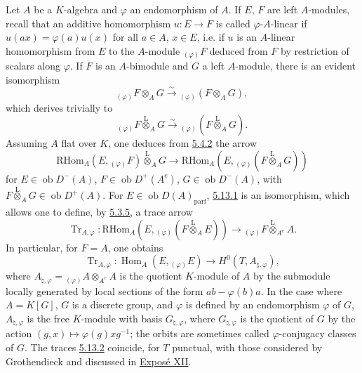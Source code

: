 \documentclass[11pt]{article}
\DeclareMathOperator{\Hom}{Hom}
\newcommand{\ob}{\operatorname{ob}}
\providecommand{\RHom}{\mathrm{RHom}}
\providecommand{\Tr}{\operatorname{Tr}}
\providecommand{\Tr}{\operatorname{Tr}}
\providecommand{\lten}{\overset{\mathrm L}{\otimes}}
\providecommand{\Tr}{\operatorname{Tr}}
\providecommand{\RHom}{\mathrm{RHom}}
\providecommand{\Hom}{\operatorname{Hom}}
\providecommand{\ob}{\operatorname{ob}}
\providecommand{\lten}{\overset{\mathrm L}{\otimes}}
\providecommand{\RHom}{\mathrm R\mathcal{H}om}
\providecommand{\lten}{\overset{\mathrm L}{\otimes}}
\providecommand{\Tr}{\operatorname{Tr}}
\providecommand{\lten}{\overset{\mathrm L}{\otimes}}
\providecommand{\lten}{\overset{\mathrm L}{\otimes}}
\providecommand{\lten}{\overset{\mathrm L}{\otimes}}
\providecommand{\RHom}{\mathrm{RHom}}
\providecommand{\Hom}{\operatorname{Hom}}
\providecommand{\Tr}{\operatorname{Tr}}
\providecommand{\lten}{\overset{\mathrm L}{\otimes}}
\begin{document}
Let $A$ be a $K$-algebra and $\varphi$ an endomorphism of $A$. If $E$, $F$ are left $A$-modules, recall that an additive homomorphism $u:E\to F$ is called $\varphi$-$A$-linear if $u(ax)=\varphi(a)u(x)$ for all $a\in A$, $x\in E$, i.e. if $u$ is an $A$-linear homomorphism from $E$ to the $A$-module ${}_{(\varphi)}F$ deduced from $F$ by restriction of scalars along $\varphi$. If $F$ is an $A$-bimodule and $G$ a left $A$-module, there is an evident isomorphism
\[
{}_{(\varphi)}F\otimes_AG\xrightarrow{\sim}{}_{(\varphi)}(F\otimes_AG),
\]
which derives trivially to
\[
{}_{(\varphi)}F\lten_AG\xrightarrow{\sim}{}_{(\varphi)}(F\lten_AG).
\]
Assuming $A$ flat over $K$, one deduces from \hyperref[sga5:IIIB:equation:5.4.2]{5.4.2} the arrow
\begin{equation}\tag{5.13.1}\label{sga5:IIIB:equation:5.13.1}
\RHom_A(E,{}_{(\varphi)}F)\lten_AG\longrightarrow\RHom_A(E,{}_{(\varphi)}(F\lten_AG))
\end{equation}
for $E\in\ob D^-(A)$, $F\in\ob D^+(A^e)$, $G\in\ob D^-(A)$, with $F\lten_AG\in\ob D^+(A)$. For $E\in\ob D(A)_{\mathrm{parf}}$, \hyperref[sga5:IIIB:equation:5.13.1]{5.13.1} is an isomorphism, which allows one to define, by \hyperref[sga5:IIIB:equation:5.3.5]{5.3.5}, a trace arrow
\begin{equation}\tag{5.13.2}\label{sga5:IIIB:equation:5.13.2}
\Tr_{A,\varphi}:\RHom_A(E,{}_{(\varphi)}(F\lten_AE))\longrightarrow {}_{(\varphi)}F\lten_{A^e}A.
\end{equation}
In particular, for $F=A$, one obtains
\begin{equation}\tag{5.13.3}\label{sga5:IIIB:equation:5.13.3}
\Tr_{A,\varphi}:\Hom_A(E,{}_{(\varphi)}E)\longrightarrow H^0(T,A_{\natural,\varphi}),
\end{equation}
where $A_{\natural,\varphi}={}_{(\varphi)}A\otimes_{A^e}A$ is the quotient $K$-module of $A$ by the submodule locally generated by local sections of the form $ab-\varphi(b)a$. In the case where $A=K[G]$, $G$ is a discrete group, and $\varphi$ is defined by an endomorphism $\varphi$ of $G$, $A_{\natural,\varphi}$ is the free $K$-module with basis $G_{\natural,\varphi}$, where $G_{\natural,\varphi}$ is the quotient of $G$ by the action $(g,x)\mapsto\varphi(g)xg^{-1}$; the orbits are sometimes called $\varphi$-conjugacy classes of $G$. The traces \hyperref[sga5:IIIB:equation:5.13.2]{5.13.2} coincide, for $T$ punctual, with those considered by Grothendieck and discussed in \hyperref[sga5:XII:expose:xii]{Exposé XII}.
\end{document}
